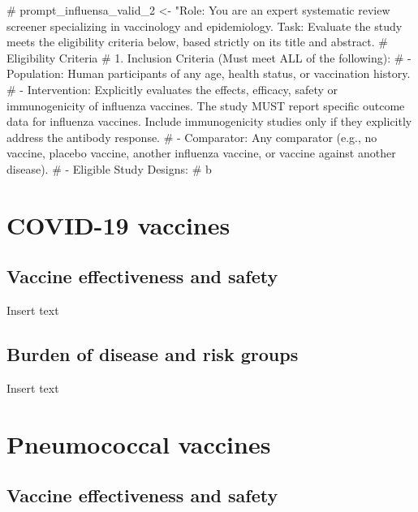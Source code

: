 \documentclass[
  letterpaper,
  DIV=11,
  numbers=noendperiod]{scrartcl}
\newenvironment{Shaded}{\begin{snugshade}}{\end{snugshade}}
\newcommand{\CommentTok}[1]{\textcolor[rgb]{0.37,0.37,0.37}{#1}}
\begin{document}
\begin{Shaded}
\begin{Highlighting}[]
\CommentTok{\# prompt\_influensa\_valid\_2 \textless{}{-} "Role: You are an expert systematic review screener specializing in vaccinology and epidemiology. Task: Evaluate the study meets the eligibility criteria below, based strictly on its title and abstract.}
\CommentTok{\# Eligibility Criteria}
\CommentTok{\# 1. Inclusion Criteria (Must meet ALL of the following):}
\CommentTok{\# {-} Population: Human participants of any age, health status, or vaccination history.}
\CommentTok{\# {-} Intervention: Explicitly evaluates the effects, efficacy, safety or immunogenicity of influenza vaccines. The study MUST report specific outcome data for influenza vaccines. Include immunogenicity studies only if they explicitly address the antibody response.}
\CommentTok{\# {-} Comparator: Any comparator (e.g., no vaccine, placebo vaccine, another influenza vaccine, or vaccine against another disease).}
\CommentTok{\# {-} Eligible Study Designs:}
\CommentTok{\# b}
\end{Highlighting}
\end{Shaded}

\section{COVID-19 vaccines}\label{covid-19-vaccines}

\subsection{Vaccine effectiveness and
safety}\label{vaccine-effectiveness-and-safety-1}

Insert text

\subsection{Burden of disease and risk
groups}\label{burden-of-disease-and-risk-groups}

Insert text

\section{Pneumococcal vaccines}\label{pneumococcal-vaccines}

\subsection{Vaccine effectiveness and
safety}\label{vaccine-effectiveness-and-safety-2}
\end{document}
